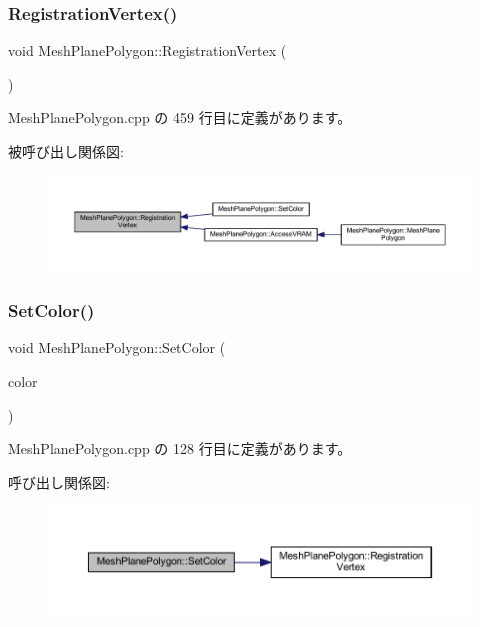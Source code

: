 \subsubsection{\texorpdfstring{Registration\+Vertex()}{RegistrationVertex()}}
{\footnotesize\ttfamily void Mesh\+Plane\+Polygon\+::\+Registration\+Vertex (\begin{DoxyParamCaption}{ }\end{DoxyParamCaption})\hspace{0.3cm}{\ttfamily [private]}}



 Mesh\+Plane\+Polygon.\+cpp の 459 行目に定義があります。

被呼び出し関係図\+:\nopagebreak
\begin{figure}[H]
\begin{center}
\leavevmode
\includegraphics[width=350pt]{class_mesh_plane_polygon_ae3c43c5641c962ac848b3dadd3ea15e5_icgraph}
\end{center}
\end{figure}
\mbox{\label{class_mesh_plane_polygon_a514e1738386a6a4be0d37ea38bd425f2}} 
\subsubsection{\texorpdfstring{Set\+Color()}{SetColor()}}
{\footnotesize\ttfamily void Mesh\+Plane\+Polygon\+::\+Set\+Color (\begin{DoxyParamCaption}\item[{\mbox{\hyperlink{_vector3_d_8h_a680c30c4a07d86fe763c7e01169cd6cc}{X\+Color4}}}]{color }\end{DoxyParamCaption})}



 Mesh\+Plane\+Polygon.\+cpp の 128 行目に定義があります。

呼び出し関係図\+:\nopagebreak
\begin{figure}[H]
\begin{center}
\leavevmode
\includegraphics[width=350pt]{class_mesh_plane_polygon_a514e1738386a6a4be0d37ea38bd425f2_cgraph}
\end{center}
\end{figure}


